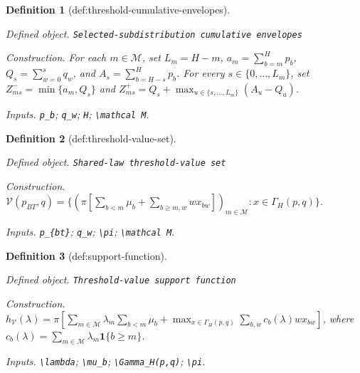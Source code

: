 \documentclass{article}
\newtheorem{definition}{Definition}
\begin{document}
\begin{definition}[def:threshold-cumulative-envelopes]\label{def:threshold-cumulative-envelopes}
\par\smallskip\noindent\emph{Defined object.} \texttt{Selected-\allowbreak{}subdistribution cumulative envelopes}
\par\smallskip\noindent\emph{Construction.} For each \(m\in\mathcal M\), set \(L_m=H-m\), \(a_m=\sum_{b=m}^{H}p_b\), \(Q_s=\sum_{w=0}^{s}q_w\), and \(A_s=\sum_{b=H-s}^{H}p_b\). For every \(s\in\{0,\ldots,L_m\}\), set \(Z_{ms}^{-}=\min\{a_m,Q_s\}\) and \(Z_{ms}^{+}=Q_s+\max_{u\in\{s,\ldots,L_m\}}(A_u-Q_u)\).
\par\smallskip\noindent\emph{Inputs.} \texttt{p\_\allowbreak{}b}; \texttt{q\_\allowbreak{}w}; \texttt{H}; \texttt{\textbackslash{}\allowbreak{}mathcal M}.
\end{definition}

\begin{definition}[def:threshold-value-set]\label{def:threshold-value-set}
\par\smallskip\noindent\emph{Defined object.} \texttt{Shared-\allowbreak{}law threshold-\allowbreak{}value set}
\par\smallskip\noindent\emph{Construction.} \(\mathcal V(p_{BT},q)=\{(\pi[\sum_{b<m}\mu_b+\sum_{b\ge m,w}w x_{bw}])_{m\in\mathcal M}:x\in\Gamma_H(p,q)\}\).
\par\smallskip\noindent\emph{Inputs.} \texttt{p\_\allowbreak{}\{bt\}\allowbreak{}}; \texttt{q\_\allowbreak{}w}; \texttt{\textbackslash{}\allowbreak{}pi}; \texttt{\textbackslash{}\allowbreak{}mathcal M}.
\end{definition}

\begin{definition}[def:support-function]\label{def:support-function}
\par\smallskip\noindent\emph{Defined object.} \texttt{Threshold-\allowbreak{}value support function}
\par\smallskip\noindent\emph{Construction.} \(h_{\mathcal V}(\lambda)=\pi[\sum_{m\in\mathcal M}\lambda_m\sum_{b<m}\mu_b+\max_{x\in\Gamma_H(p,q)}\sum_{b,w}c_b(\lambda)w x_{bw}]\), where \(c_b(\lambda)=\sum_{m\in\mathcal M}\lambda_m\mathbf 1\{b\ge m\}\).
\par\smallskip\noindent\emph{Inputs.} \texttt{\textbackslash{}\allowbreak{}lambda}; \texttt{\textbackslash{}\allowbreak{}mu\_\allowbreak{}b}; \texttt{\textbackslash{}\allowbreak{}Gamma\_\allowbreak{}H(p,\allowbreak{}q)}; \texttt{\textbackslash{}\allowbreak{}pi}.
\end{definition}
\end{document}

